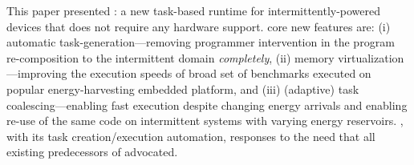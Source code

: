This paper presented \sys: a new task-based runtime for intermittently-powered devices that does not require any hardware support. \sys core new features are: (i) automatic task-generation---removing programmer intervention in the program re-composition to the intermittent domain \emph{completely}, (ii) memory virtualization---improving the execution speeds of broad set of benchmarks executed on popular energy-harvesting embedded platform, and (iii) (adaptive) task coalescing---enabling fast execution despite changing energy arrivals and enabling re-use of the same code on intermittent systems with varying energy reservoirs. \sys, with its task creation/execution automation, responses to the need that all existing predecessors of \sys advocated. 


